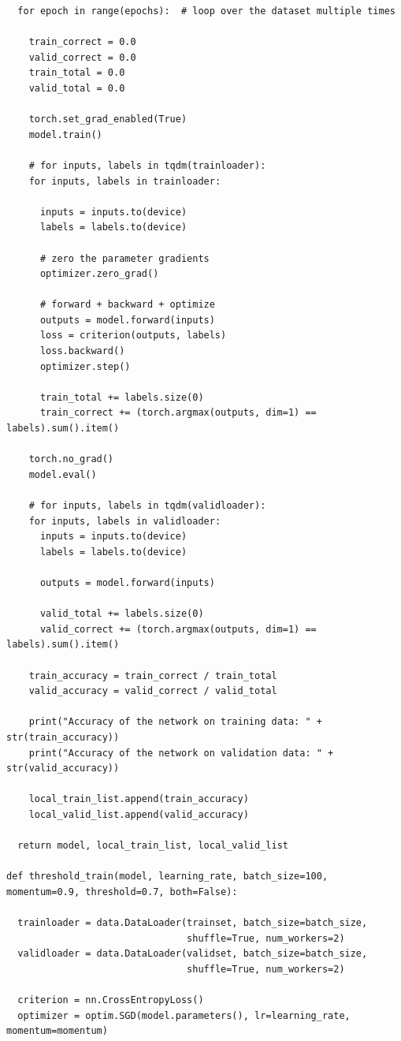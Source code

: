 \documentclass{article}
\newcommand{\1}{\mathbf{1}}
\begin{document}
{\begin{verbatim}
  for epoch in range(epochs):  # loop over the dataset multiple times

    train_correct = 0.0
    valid_correct = 0.0
    train_total = 0.0
    valid_total = 0.0

    torch.set_grad_enabled(True)
    model.train()

    # for inputs, labels in tqdm(trainloader):
    for inputs, labels in trainloader:

      inputs = inputs.to(device)
      labels = labels.to(device)

      # zero the parameter gradients
      optimizer.zero_grad()

      # forward + backward + optimize
      outputs = model.forward(inputs)
      loss = criterion(outputs, labels)
      loss.backward()
      optimizer.step()
        
      train_total += labels.size(0)
      train_correct += (torch.argmax(outputs, dim=1) == labels).sum().item()
    
    torch.no_grad()
    model.eval()

    # for inputs, labels in tqdm(validloader):
    for inputs, labels in validloader:
      inputs = inputs.to(device)
      labels = labels.to(device)

      outputs = model.forward(inputs)
        
      valid_total += labels.size(0)
      valid_correct += (torch.argmax(outputs, dim=1) == labels).sum().item()

    train_accuracy = train_correct / train_total
    valid_accuracy = valid_correct / valid_total

    print("Accuracy of the network on training data: " + str(train_accuracy))
    print("Accuracy of the network on validation data: " + str(valid_accuracy))

    local_train_list.append(train_accuracy)
    local_valid_list.append(valid_accuracy)

  return model, local_train_list, local_valid_list

def threshold_train(model, learning_rate, batch_size=100, momentum=0.9, threshold=0.7, both=False):
  
  trainloader = data.DataLoader(trainset, batch_size=batch_size,
                                shuffle=True, num_workers=2)
  validloader = data.DataLoader(validset, batch_size=batch_size,
                                shuffle=True, num_workers=2)

  criterion = nn.CrossEntropyLoss()
  optimizer = optim.SGD(model.parameters(), lr=learning_rate, momentum=momentum)


\end{verbatim}}
\end{document}
